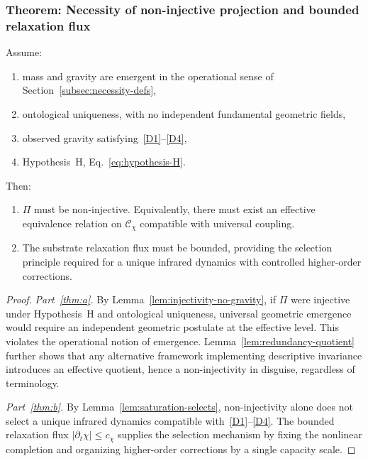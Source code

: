   \subsubsection*{Theorem: Necessity of non-injective projection and bounded relaxation flux}
    \label{subsec:necessity-theorem}

    \begin{theorem}
      \label{thm:necessity}
      Assume:
      \begin{enumerate}[label=(\roman*)]
  \item mass and gravity are emergent in the operational sense of Section~\ref{subsec:necessity-defs},
  \item ontological uniqueness, with no independent fundamental geometric fields,
  \item observed gravity satisfying~\ref{D1}--\ref{D4},
  \item Hypothesis~H, Eq.~\ref{eq:hypothesis-H}.
      \end{enumerate}
      Then:
      \begin{enumerate}[label=(\alph*)]
  \item \label{thm:a}
  $\Pi$ must be non-injective.
  Equivalently, there must exist an effective equivalence relation on $\mathcal{C}_\chi$
  compatible with universal coupling.
  \item \label{thm:b}
  The substrate relaxation flux must be bounded, providing the selection principle required for a unique infrared
  dynamics
  with controlled higher-order corrections.
      \end{enumerate}
    \end{theorem}

    \begin{proof}
      \textit{Part~\ref{thm:a}.}
      By Lemma~\ref{lem:injectivity-no-gravity}, if $\Pi$ were injective under Hypothesis~H and ontological uniqueness,
      universal geometric emergence would require an independent geometric postulate at the effective level.
      This violates the operational notion of emergence.
      Lemma~\ref{lem:redundancy-quotient}
      further shows that any alternative framework implementing descriptive invariance
      introduces an effective quotient, hence a non-injectivity in disguise, regardless of terminology.

      \textit{Part~\ref{thm:b}.}
      By Lemma~\ref{lem:saturation-selects}, non-injectivity alone does not select a unique infrared dynamics compatible
      with~\ref{D1}--\ref{D4}.
      The bounded relaxation flux $|\partial_t \chi| \leq c_\chi$
      supplies the selection mechanism by fixing the nonlinear
      completion and organizing higher-order corrections by a single capacity scale.
    \end{proof}


